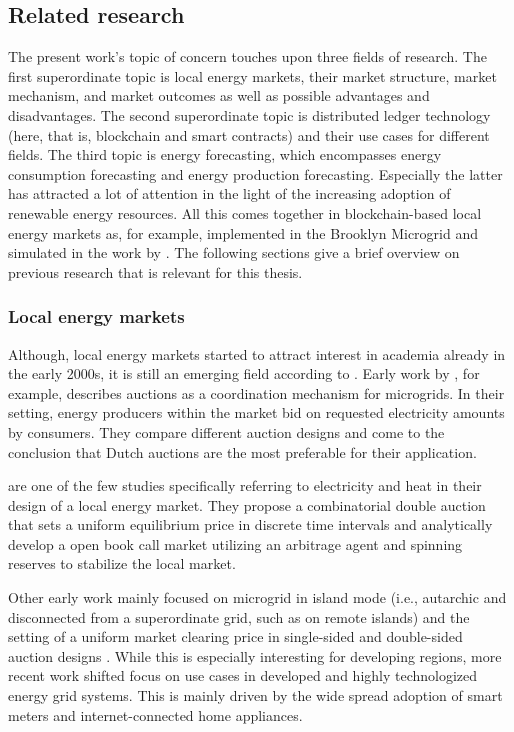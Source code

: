 
\subsection{Related research}\label{Sec:Intro;Subsec:Related}
The present work's topic of concern touches upon three fields of research. The first superordinate topic is local energy markets, their market structure, market mechanism, and market outcomes as well as possible advantages and disadvantages. The second superordinate topic is distributed ledger technology (here, that is, blockchain and smart contracts) and their use cases for different fields. The third topic is energy forecasting, which encompasses energy consumption forecasting and energy production forecasting. Especially the latter has attracted a lot of attention in the light of the increasing adoption of renewable energy resources. All this comes together in blockchain-based local energy markets as, for example, implemented in the Brooklyn Microgrid and simulated in the work by \citet{Mengelkamp:2018a}. The following sections give a brief overview on previous research that is relevant for this thesis.



\subsubsection{Local energy markets}

Although, local energy markets started to attract interest in academia already in the early 2000s, it is still an emerging field according to \citet{Stadler:2016}. Early work by \citet{Alibhai:2004}, for example, describes auctions as a coordination mechanism for microgrids. In their setting, energy producers within the market bid on requested electricity amounts by consumers. They compare different auction designs and come to the conclusion that Dutch auctions are the most preferable for their application.

\citet{Block:2008} are one of the few studies specifically referring to electricity and heat in their design of a local energy market. They propose a combinatorial double auction that sets a uniform equilibrium price in discrete time intervals and analytically develop a open book call market utilizing an arbitrage agent and spinning reserves to stabilize the local market.

Other early work mainly focused on microgrid in island mode (i.e., autarchic and disconnected from a superordinate grid, such as on remote islands) and the setting of a uniform market clearing price in single-sided and double-sided auction designs \citep{Sinha:2008}. While this is especially interesting for developing regions, more recent work shifted focus on use cases in developed and highly technologized energy grid systems. This is mainly driven by the wide spread adoption of smart meters and internet-connected home appliances.

